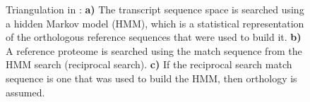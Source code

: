 \begin{figure}[t]
	\centering
	\def\svgwidth{0.8\textwidth}
	
	\caption[Triangulation in \hamstr]{Triangulation in \hamstr:
		\textbf{a)} The transcript sequence space is searched using a hidden Markov
			model (HMM), which is a statistical representation of the orthologous
			reference sequences that were used to build it.
		\textbf{b)} A reference proteome is searched using the match sequence from
			the HMM search (reciprocal search).
		\textbf{c)} If the reciprocal search match sequence is one that was used to
			build the HMM, then orthology is assumed.
	}
	\label{fig:hamstr-triangulation}
\end{figure}


